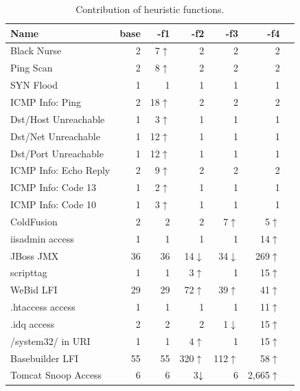 \documentclass[conference]{IEEEtran}
\begin{document}
\begin{table}[t!]
  \footnotesize
  \setlength{\tabcolsep}{8pt}
  \renewcommand{\arraystretch}{-0.01}
  \caption{\label{table:weights}Contribution of heuristic functions.}
  \vspace{-2ex}
  \centering
  \begin{tabular}{lrrrrrr}
    \toprule
    Name &
    base &
    -f1 &
    -f2 &    
    -f3 &
    -f4 \\
    \midrule
    Black Nurse & 2 & 7$\uparrow$ & 2 & 2 & 2 \\    
    Ping Scan & 2 &  8$\uparrow$& 2 & 2 & 2 \\
    SYN Flood & 1 & 1 & 1 & 1 & 1 \\
    ICMP Info: Ping & 2 & 18$\uparrow$& 2 & 2 & 2 \\
    Dst/Host Unreachable & 1 & 3$\uparrow$ & 1 & 1 & 1 \\
    Dst/Net Unreachable & 1 & 12$\uparrow$ & 1 & 1 & 1 \\
    Dst/Port Unreachable & 1 & 12$\uparrow$ & 1 & 1 & 1 \\
    ICMP Info: Echo Reply & 2 & 9$\uparrow$ & 2 & 2 & 2 \\
    ICMP Info: Code 13 & 1 & 2$\uparrow$ & 1 & 1 & 1 \\
    ICMP Info: Code 10 & 1 & 3$\uparrow$ & 1 & 1 & 1 \\
    \midrule
    ColdFusion & 2 & 2 & 2 & 7$\uparrow$ & 5$\uparrow$ \\
    iisadmin access & 1  & 1 & 1 & 1 & 14$\uparrow$\\        
    JBoss JMX & 36 & 36 & 14\cellcolor{lightgray}$\downarrow$ & 34\cellcolor{lightgray}$\downarrow$ & 269$\uparrow$ \\
    scripttag & 1 & 1 & 3$\uparrow$ & 1 & 15$\uparrow$ \\
    WeBid LFI & 29 & 29 & 72$\uparrow$ & 39$\uparrow$ & 41$\uparrow$ \\    
    .htaccess access & 1  & 1 & 1 & 1 & 11$\uparrow$\\
    .idq access & 2  & 2 & 2 & 1\cellcolor{lightgray}$\downarrow$ & 15$\uparrow$ \\
    /system32/ in URI & 1  & 1 & 4$\uparrow$ & 1 & 15$\uparrow$\\
    Basebuilder LFI & 55  & 55 & 320$\uparrow$ & 112$\uparrow$ & 58$\uparrow$\\
      Tomcat Snoop Access & 6 & 6 & 3$\cellcolor{lightgray}\downarrow$ & 6 & 2,665$\uparrow$\\
    \bottomrule
  \end{tabular}
\end{table}
\end{document}
